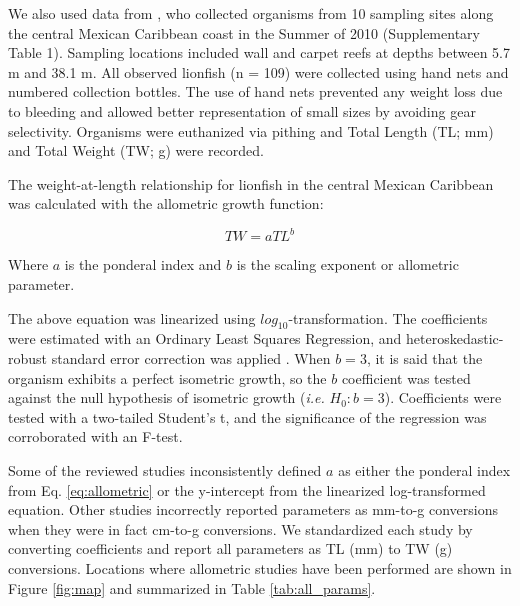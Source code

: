 \documentclass[fleqn,10pt,lineno]{wlpeerj} %
\begin{document}
We also used data from \citet{villaseorderbez_2014}, who collected
organisms from 10 sampling sites along the central Mexican Caribbean
coast in the Summer of 2010 (Supplementary Table 1). Sampling locations
included wall and carpet reefs at depths between 5.7 m and 38.1 m. All
observed lionfish (n = 109) were collected using hand nets and numbered
collection bottles. The use of hand nets prevented any weight loss due
to bleeding and allowed better representation of small sizes by avoiding
gear selectivity. Organisms were euthanized via pithing and Total Length
(TL; mm) and Total Weight (TW; g) were recorded.

\clearpage

The weight-at-length relationship for lionfish in the central Mexican
Caribbean was calculated with the allometric growth function:

\begin{equation}
\label{eq:allometric}
TW = aTL^b
\end{equation}

Where \(a\) is the ponderal index and \(b\) is the scaling exponent or
allometric parameter.

The above equation was linearized using \(log_{10}\)-transformation. The
coefficients were estimated with an Ordinary Least Squares Regression,
and heteroskedastic-robust standard error correction was applied
\citep{zeileis_2004}. When \(b = 3\), it is said that the organism
exhibits a perfect isometric growth, so the \(b\) coefficient was tested
against the null hypothesis of isometric growth (\emph{i.e.}
\(H_0: b = 3\)). Coefficients were tested with a two-tailed Student's t,
and the significance of the regression was corroborated with an F-test.

Some of the reviewed studies inconsistently defined \(a\) as either the
ponderal index from Eq. \ref{eq:allometric} or the y-intercept from the
linearized log-transformed equation. Other studies incorrectly reported
parameters as mm-to-g conversions when they were in fact cm-to-g
conversions. We standardized each study by converting coefficients and
report all parameters as TL (mm) to TW (g) conversions. Locations where
allometric studies have been performed are shown in Figure \ref{fig:map}
and summarized in Table \ref{tab:all_params}.
\end{document}
